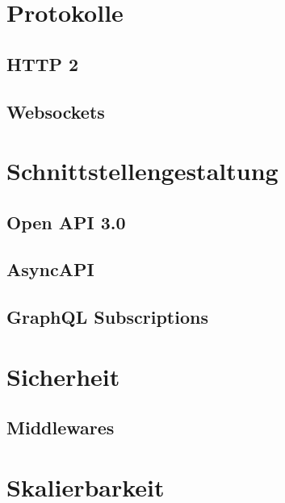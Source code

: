 \section{Protokolle}
\label{sec:protokolle}
\subsection{HTTP 2}
\label{subsec:http2}

\subsection{Websockets}
\label{subsec:websockets}


\section{Schnittstellengestaltung}
\label{sec:schnittstellengestaltung}

\subsection{Open API 3.0}
\label{subsec:openapi3}

\subsection{AsyncAPI}
\label{subsec:asyncapi}

\subsection{GraphQL Subscriptions}
\label{subsec:graphqlsubscriptions}

\section{Sicherheit}
\label{sec:sicherheit}

\subsection{Middlewares}
\label{subsec:middlewares}



\section{Skalierbarkeit}
\label{sec:skalierbarkeit}
